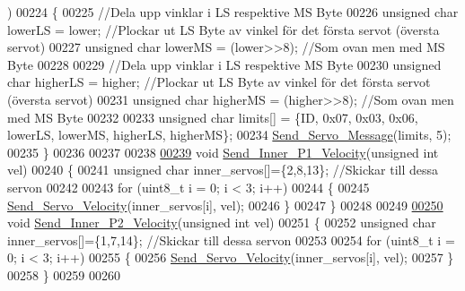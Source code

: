 \begin{DoxyCode}
      )
00224 \{
00225     \textcolor{comment}{//Dela upp vinklar i LS respektive MS Byte}
00226     \textcolor{keywordtype}{unsigned} \textcolor{keywordtype}{char} lowerLS = lower; \textcolor{comment}{//Plockar ut LS Byte av vinkel för det första servot (översta servot)}
00227     \textcolor{keywordtype}{unsigned} \textcolor{keywordtype}{char} lowerMS = (lower>>8); \textcolor{comment}{//Som ovan men med MS Byte}
00228     
00229     \textcolor{comment}{//Dela upp vinklar i LS respektive MS Byte}
00230     \textcolor{keywordtype}{unsigned} \textcolor{keywordtype}{char} higherLS = higher; \textcolor{comment}{//Plockar ut LS Byte av vinkel för det första servot (översta servot)}
00231     \textcolor{keywordtype}{unsigned} \textcolor{keywordtype}{char} higherMS = (higher>>8); \textcolor{comment}{//Som ovan men med MS Byte}
00232     
00233     \textcolor{keywordtype}{unsigned} \textcolor{keywordtype}{char} limits[] = \{ID, 0x07, 0x03, 0x06, lowerLS, lowerMS, higherLS, higherMS\};
00234     \hyperlink{servo___u_a_r_t_8c_a2ed3a2903977a774d1b174665d50661c}{Send\_Servo\_Message}(limits, 5);
00235 \}
00236 
00237 
00238 
\hypertarget{servo___u_a_r_t_8c_source.tex_l00239}{}\hyperlink{servo___u_a_r_t_8h_ace1792c5f066181d607cb075a87f3178}{00239} \textcolor{keywordtype}{void} \hyperlink{servo___u_a_r_t_8c_ace1792c5f066181d607cb075a87f3178}{Send\_Inner\_P1\_Velocity}(\textcolor{keywordtype}{unsigned} \textcolor{keywordtype}{int} vel)
00240 \{   
00241     \textcolor{keywordtype}{unsigned} \textcolor{keywordtype}{char} inner\_servos[]=\{2,8,13\}; \textcolor{comment}{//Skickar till dessa servon }
00242         
00243     \textcolor{keywordflow}{for} (uint8\_t i = 0; i < 3; i++)
00244     \{
00245         \hyperlink{servo___u_a_r_t_8c_ac325c1636bc0a1c5b6cbe967bca0a6d2}{Send\_Servo\_Velocity}(inner\_servos[i], vel);
00246     \}
00247 \}
00248 
00249 
\hypertarget{servo___u_a_r_t_8c_source.tex_l00250}{}\hyperlink{servo___u_a_r_t_8h_a9cb7e763d9a3501fc345a424d67975a7}{00250} \textcolor{keywordtype}{void} \hyperlink{servo___u_a_r_t_8c_a9cb7e763d9a3501fc345a424d67975a7}{Send\_Inner\_P2\_Velocity}(\textcolor{keywordtype}{unsigned} \textcolor{keywordtype}{int} vel)
00251 \{   
00252     \textcolor{keywordtype}{unsigned} \textcolor{keywordtype}{char} inner\_servos[]=\{1,7,14\}; \textcolor{comment}{//Skickar till dessa servon }
00253         
00254     \textcolor{keywordflow}{for} (uint8\_t i = 0; i < 3; i++)
00255     \{
00256         \hyperlink{servo___u_a_r_t_8c_ac325c1636bc0a1c5b6cbe967bca0a6d2}{Send\_Servo\_Velocity}(inner\_servos[i], vel);
00257     \}
00258 \}
00259 
00260 

\end{DoxyCode}
